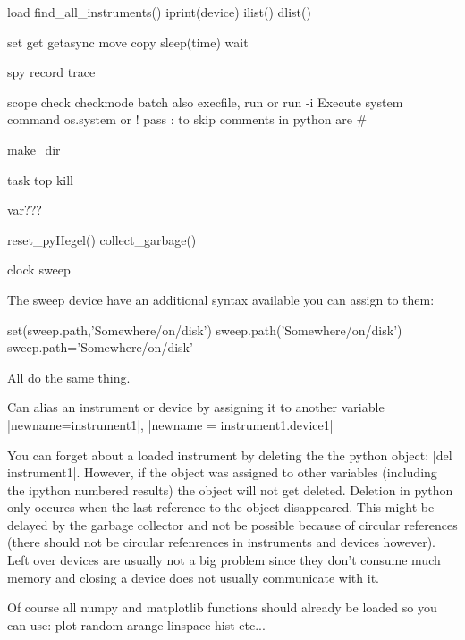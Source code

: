 \documentclass[letterpaper,12pt]{article}
\begin{document}
\begin{code}
load
find_all_instruments()
iprint(device)
ilist()
dlist()

set
get
getasync
move
copy
sleep(time)
wait

spy
record
trace

scope
check
checkmode
batch
also execfile, run or run -i
Execute system command
os.system or !
pass : to skip
comments in python are #

make_dir

task
top
kill

var???

reset_pyHegel()
collect_garbage()

clock
sweep
\end{code}
The sweep device have an additional syntax available you can assign to them:
\begin{code}
set(sweep.path,'Somewhere/on/disk')
sweep.path('Somewhere/on/disk')
sweep.path='Somewhere/on/disk'
\end{code}
All do the same thing.


Can alias an instrument or device by assigning it to another variable
|newname=instrument1|, |newname = instrument1.device1|

You can forget about a loaded instrument by deleting the the python object:
|del instrument1|. However, if the object was assigned to other variables (including the ipython numbered results) the object will not get deleted. Deletion
in python only occures when the last reference to the object disappeared.
This might be delayed by the garbage collector and not be possible because
of circular references (there should not be circular refenrences in instruments
and devices however). Left over devices are usually not a big problem since they
don't consume much memory and closing a device does not usually communicate
with it.

Of course all numpy and matplotlib functions should already be loaded so 
you can use:
plot
random
arange
linspace
hist
etc...
\end{document}
